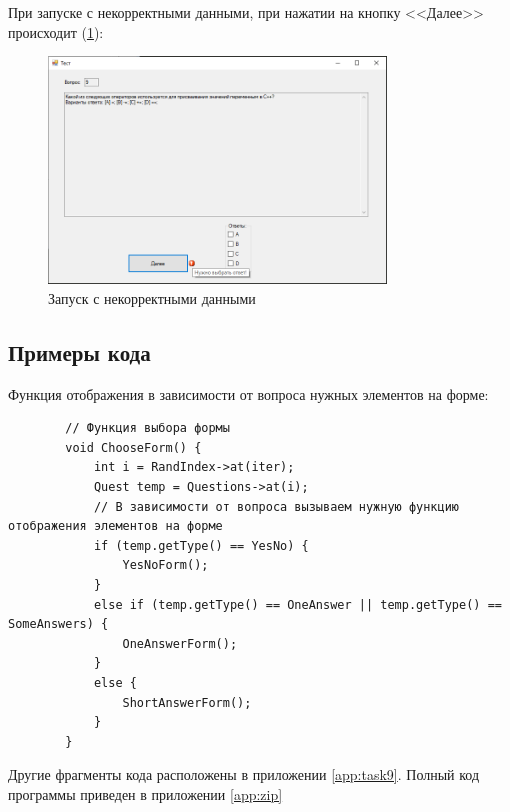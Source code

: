 При запуске с некорректными данными, при нажатии на кнопку <<Далее>> происходит (\ref{fig:BadInputNotIntForm9}):

\newpage

\begin{figure}[!h]
    \centering
    \includegraphics[width = 0.8\textwidth]{images/Task9/OneAnswerBadInput.png}
    \caption{Запуск с некорректными данными}
    \label{fig:BadInputNotIntForm9}
\end{figure}

\subsection{Примеры кода}

Функция отображения в зависимости от вопроса нужных элементов на форме:

\begin{verbatim}
		// Функция выбора формы
		void ChooseForm() {
			int i = RandIndex->at(iter);
			Quest temp = Questions->at(i);
			// В зависимости от вопроса вызываем нужную функцию отображения элементов на форме
			if (temp.getType() == YesNo) {
				YesNoForm();
			}
			else if (temp.getType() == OneAnswer || temp.getType() == SomeAnswers) {
				OneAnswerForm();
			}
			else {
				ShortAnswerForm();
			}
		}
\end{verbatim}

Другие фрагменты кода расположены в приложении \ref{app:task9}. Полный код программы приведен в приложении \ref{app:zip}
